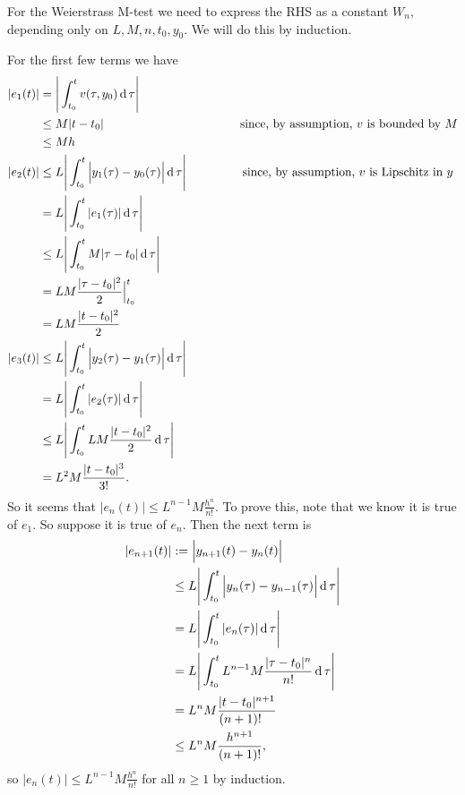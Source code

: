 For the Weierstrass M-test we need to express the RHS as a constant $W_n$,
depending only on $L, M, n, t_0, y_0$. We will do this by induction.

For the first few terms we have
\begin{align*}
  |e_1(t)| &    = \Bigg|\int_{t_0}^t v(\tau, y_0) \operatorname{\text{d}}\tau\Bigg|\\
           & \leq M|t - t_0| ~~~~~~~~~~~~~~~~~~~~~~~~~~~~~~~~~~\text{since, by assumption, $v$ is bounded by $M$}\\
           & \leq Mh\\
  |e_2(t)| & \leq L\Bigg|\int_{t_0}^t \Big|y_1(\tau) - y_0(\tau)\Big| \operatorname{\text{d}}\tau\Bigg| ~~~~~~~~~~~~~~\text{since, by assumption, $v$ is Lipschitz in $y$}\\
           &    = L\Bigg|\int_{t_0}^t |e_1(\tau)| \operatorname{\text{d}}\tau\Bigg|\\
           & \leq L\Bigg|\int_{t_0}^t M|\tau - t_0| \operatorname{\text{d}}\tau\Bigg|\\
           &    = LM\frac{|\tau - t_0|^2}{2} \Big|_{t_0}^t \\
           &    = LM\frac{|t - t_0|^2}{2} \\
  |e_3(t)| & \leq L\Bigg|\int_{t_0}^t \Big|y_2(\tau) - y_1(\tau)\Big| \operatorname{\text{d}}\tau\Bigg|\\
           &    = L\Bigg|\int_{t_0}^t |e_2(\tau)| \operatorname{\text{d}}\tau\Bigg|\\
           & \leq L\Bigg|\int_{t_0}^t LM\frac{|t - t_0|^2}{2} \operatorname{\text{d}}\tau\Bigg|\\
           &    = L^2M\frac{|t - t_0|^3}{3!}.
\end{align*}
So it seems that $|e_n(t)| \leq L^{n-1}M\frac{h^n}{n!}$. To prove this, note that we know
it is true of $e_1$. So suppose it is true of $e_n$. Then the next term is
\begin{align*}
  |e_{n+1}(t)| & :=   \Big|y_{n+1}(t) - y_n(t)\Big|\\
              & \leq L\Bigg|\int_{t_0}^t \Big|y_n(\tau) - y_{n-1}(\tau)\Big| \operatorname{\text{d}}\tau\Bigg|\\
              &=     L\Bigg|\int_{t_0}^t |e_n(\tau)| \operatorname{\text{d}}\tau\Bigg|\\
              &=     L\Bigg|\int_{t_0}^t L^{n-1}M\frac{|\tau - t_0|^n}{n!} \operatorname{\text{d}}\tau\Bigg|\\
              &=     L^nM\frac{|t - t_0|^{n+1}}{(n+1)!^{~~~}}\\
              & \leq L^nM\frac{h^{n+1}}{(n+1)!},
\end{align*}
so $|e_n(t)| \leq L^{n-1}M\frac{h^n}{n!}$ for all $n \geq 1$ by induction.


